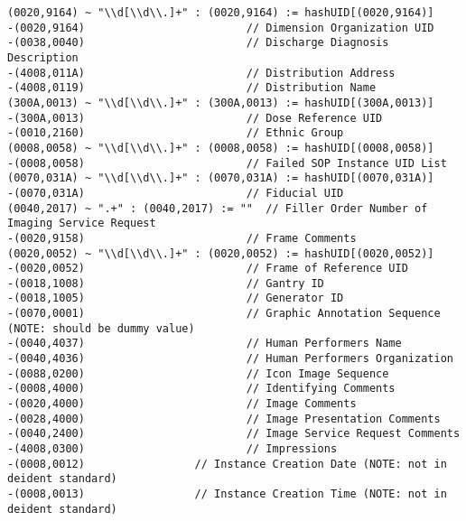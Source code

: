 \documentclass{beamer}  %
\begin{document}
\begin{frame}[fragile]
\tiny
\begin{verbatim}
(0020,9164) ~ "\\d[\\d\\.]+" : (0020,9164) := hashUID[(0020,9164)]
-(0020,9164)                         // Dimension Organization UID
-(0038,0040)                         // Discharge Diagnosis Description
-(4008,011A)                         // Distribution Address
-(4008,0119)                         // Distribution Name
(300A,0013) ~ "\\d[\\d\\.]+" : (300A,0013) := hashUID[(300A,0013)]
-(300A,0013)                         // Dose Reference UID
-(0010,2160)                         // Ethnic Group
(0008,0058) ~ "\\d[\\d\\.]+" : (0008,0058) := hashUID[(0008,0058)]
-(0008,0058)                         // Failed SOP Instance UID List
(0070,031A) ~ "\\d[\\d\\.]+" : (0070,031A) := hashUID[(0070,031A)]
-(0070,031A)                         // Fiducial UID
(0040,2017) ~ ".+" : (0040,2017) := ""  // Filler Order Number of Imaging Service Request
-(0020,9158)                         // Frame Comments
(0020,0052) ~ "\\d[\\d\\.]+" : (0020,0052) := hashUID[(0020,0052)]
-(0020,0052)                         // Frame of Reference UID
-(0018,1008)                         // Gantry ID
-(0018,1005)                         // Generator ID
-(0070,0001)                         // Graphic Annotation Sequence (NOTE: should be dummy value)
-(0040,4037)                         // Human Performers Name
-(0040,4036)                         // Human Performers Organization
-(0088,0200)                         // Icon Image Sequence
-(0008,4000)                         // Identifying Comments
-(0020,4000)                         // Image Comments
-(0028,4000)                         // Image Presentation Comments
-(0040,2400)                         // Image Service Request Comments
-(4008,0300)                         // Impressions
-(0008,0012)			     // Instance Creation Date (NOTE: not in deident standard)
-(0008,0013)			     // Instance Creation Time (NOTE: not in deident standard)
\end{verbatim}
\end{frame}
\end{document}
